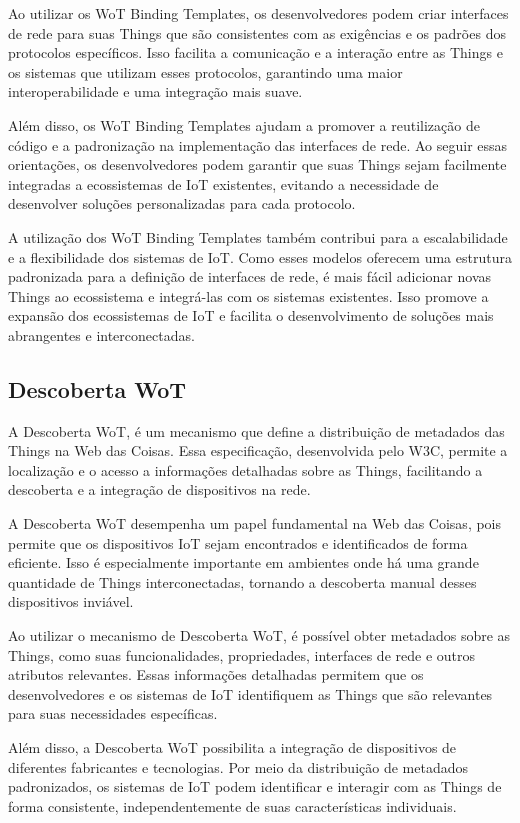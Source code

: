Ao utilizar os WoT Binding Templates, os desenvolvedores podem criar interfaces de rede para suas Things que são consistentes com as exigências e os padrões dos protocolos específicos. Isso facilita a comunicação e a interação entre as Things e os sistemas que utilizam esses protocolos, garantindo uma maior interoperabilidade e uma integração mais suave.

Além disso, os WoT Binding Templates ajudam a promover a reutilização de código e a padronização na implementação das interfaces de rede. Ao seguir essas orientações, os desenvolvedores podem garantir que suas Things sejam facilmente integradas a ecossistemas de IoT existentes, evitando a necessidade de desenvolver soluções personalizadas para cada protocolo.

A utilização dos WoT Binding Templates também contribui para a escalabilidade e a flexibilidade dos sistemas de IoT. Como esses modelos oferecem uma estrutura padronizada para a definição de interfaces de rede, é mais fácil adicionar novas Things ao ecossistema e integrá-las com os sistemas existentes. Isso promove a expansão dos ecossistemas de IoT e facilita o desenvolvimento de soluções mais abrangentes e interconectadas.

\subsection{Descoberta WoT}

A Descoberta WoT, é um mecanismo que define a distribuição de metadados das Things na Web das Coisas. Essa especificação, desenvolvida pelo W3C, permite a localização e o acesso a informações detalhadas sobre as Things, facilitando a descoberta e a integração de dispositivos na rede.

A Descoberta WoT desempenha um papel fundamental na Web das Coisas, pois permite que os dispositivos IoT sejam encontrados e identificados de forma eficiente. Isso é especialmente importante em ambientes onde há uma grande quantidade de Things interconectadas, tornando a descoberta manual desses dispositivos inviável.

Ao utilizar o mecanismo de Descoberta WoT, é possível obter metadados sobre as Things, como suas funcionalidades, propriedades, interfaces de rede e outros atributos relevantes. Essas informações detalhadas permitem que os desenvolvedores e os sistemas de IoT identifiquem as Things que são relevantes para suas necessidades específicas.

Além disso, a Descoberta WoT possibilita a integração de dispositivos de diferentes fabricantes e tecnologias. Por meio da distribuição de metadados padronizados, os sistemas de IoT podem identificar e interagir com as Things de forma consistente, independentemente de suas características individuais.

